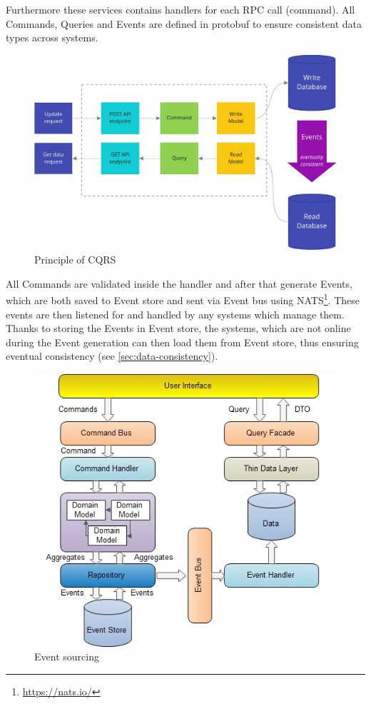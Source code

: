\documentclass[11pt,a4paper]{article}
\begin{document}
	Furthermore these services contains handlers for each RPC call (command). All Commands, Queries and Events are defined in protobuf to ensure consistent data types across systems.
	
	\begin{figure}
		\centering
		\includegraphics[width=0.7\linewidth]{img/cqrs}
		\caption{Principle of CQRS}
		\label{fig:cqrs}
	\end{figure}
	
	
	All Commands are validated inside the handler and after that generate Events, which are both saved to Event store and sent via Event bus using NATS\footnote{\url{https://nats.io/}}. These events are then listened for and handled by any systems which manage them. Thanks to storing the Events in Event store, the systems, which are not online during the Event generation can then load them from Event store, thus ensuring eventual consistency (see \ref{sec:data-consistency}).	
	
	\begin{figure}
		\centering
		\includegraphics[width=0.7\linewidth]{img/cqrs-event_sourcing}
		\caption{Event sourcing}
		\label{fig:cqrs-eventsourcing}
	\end{figure}
	
\end{document}

